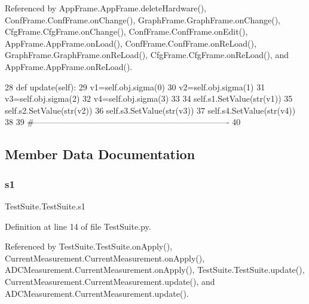 Referenced by App\+Frame.\+App\+Frame.\+delete\+Hardware(), Conf\+Frame.\+Conf\+Frame.\+on\+Change(), Graph\+Frame.\+Graph\+Frame.\+on\+Change(), Cfg\+Frame.\+Cfg\+Frame.\+on\+Change(), Conf\+Frame.\+Conf\+Frame.\+on\+Edit(), App\+Frame.\+App\+Frame.\+on\+Load(), Conf\+Frame.\+Conf\+Frame.\+on\+Re\+Load(), Graph\+Frame.\+Graph\+Frame.\+on\+Re\+Load(), Cfg\+Frame.\+Cfg\+Frame.\+on\+Re\+Load(), and App\+Frame.\+App\+Frame.\+on\+Re\+Load().


\begin{DoxyCode}
28     \textcolor{keyword}{def }update(self):
29         v1=self.obj.sigma(0)
30         v2=self.obj.sigma(1)
31         v3=self.obj.sigma(2)
32         v4=self.obj.sigma(3)
33 
34         self.s1.SetValue(str(v1))
35         self.s2.SetValue(str(v2))
36         self.s3.SetValue(str(v3))
37         self.s4.SetValue(str(v4))        
38 
39 \textcolor{comment}{#----------------------------------------------------------------------}
40 
\end{DoxyCode}


\subsection{Member Data Documentation}
\mbox{\label{classTestSuite_1_1TestSuite_a314e3935627e2cd3c18e13746a9758fd}} 
\subsubsection{\texorpdfstring{s1}{s1}}
{\footnotesize\ttfamily Test\+Suite.\+Test\+Suite.\+s1}



Definition at line 14 of file Test\+Suite.\+py.



Referenced by Test\+Suite.\+Test\+Suite.\+on\+Apply(), Current\+Measurement.\+Current\+Measurement.\+on\+Apply(), A\+D\+C\+Measurement.\+Current\+Measurement.\+on\+Apply(), Test\+Suite.\+Test\+Suite.\+update(), Current\+Measurement.\+Current\+Measurement.\+update(), and A\+D\+C\+Measurement.\+Current\+Measurement.\+update().

\mbox{\label{classTestSuite_1_1TestSuite_a30791bbda8dc9662453603b1be89281a}} 
